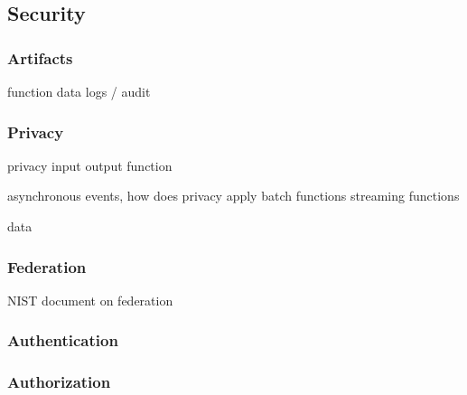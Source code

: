 
\subsection{Security}
\label{sec:security}

\subsubsection{Artifacts}

function
data
logs / audit

\subsubsection{Privacy}

privacy
    input
    output
    function
    
asynchronous events, how does privacy apply
batch functions
streaming functions

data


\subsubsection{Federation}

NIST document on federation
\cite{nist-Lee2020}

\subsubsection{Authentication}

\subsubsection{Authorization}

